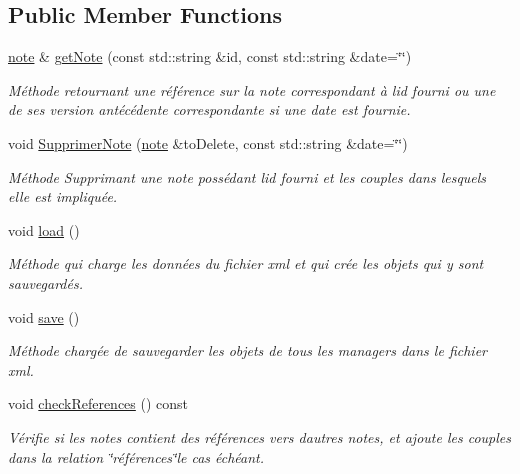 \subsection*{Public Member Functions}
\begin{DoxyCompactItemize}
\item 
\hyperlink{classnote}{note} \& \hyperlink{class_notes_manager2_a53819d123894c31bbbab66b3d0bf0ff0}{get\+Note} (const std\+::string \&id, const std\+::string \&date=\char`\"{}\char`\"{})
\begin{DoxyCompactList}\small\item\em Méthode retournant une référence sur la note correspondant à l\textquotesingle{}id fourni ou une de ses version antécédente correspondante si une date est fournie. \end{DoxyCompactList}\item 
void \hyperlink{class_notes_manager2_ac020f8488f0f71f92de1e8131a64d943}{Supprimer\+Note} (\hyperlink{classnote}{note} \&to\+Delete, const std\+::string \&date=\char`\"{}\char`\"{})
\begin{DoxyCompactList}\small\item\em Méthode Supprimant une note possédant l\textquotesingle{}id fourni et les couples dans lesquels elle est impliquée. \end{DoxyCompactList}\item 
void \hyperlink{class_notes_manager2_a2248b5b1620b2039fdba9b3c6476c6cc}{load} ()
\begin{DoxyCompactList}\small\item\em Méthode qui charge les données du fichier xml et qui crée les objets qui y sont sauvegardés. \end{DoxyCompactList}\item 
void \hyperlink{class_notes_manager2_a03224a8a150d7d7a40a6633ab2afc7c0}{save} ()
\begin{DoxyCompactList}\small\item\em Méthode chargée de sauvegarder les objets de tous les managers dans le fichier xml. \end{DoxyCompactList}\item 
\mbox{\label{class_notes_manager2_a41ec18388f556565d78794ae042511b2}} 
void \hyperlink{class_notes_manager2_a41ec18388f556565d78794ae042511b2}{check\+References} () const
\begin{DoxyCompactList}\small\item\em Vérifie si les notes contient des références vers d\textquotesingle{}autres notes, et ajoute les couples dans la relation \char`\"{}références\char`\"{}le cas échéant. \end{DoxyCompactList}\end{DoxyCompactItemize}
